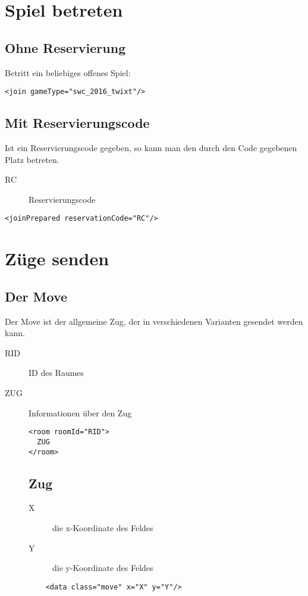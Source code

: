 \documentclass[12pt,a4paper, ngerman, oneside]{scrartcl}
\begin{document}
\section{Spiel betreten}
\subsection{Ohne Reservierung}
Betritt ein beliebiges offenes Spiel:
\begin{verbatim}
<join gameType="swc_2016_twixt"/>
\end{verbatim}
\subsection{Mit Reservierungscode}
Ist ein Reservierungscode gegeben, so kann man den durch den Code gegebenen Platz betreten.
\begin{description}
\item[RC] Reservierungscode
\end{description}
\begin{verbatim}
<joinPrepared reservationCode="RC"/>
\end{verbatim}

\section{Z\"uge senden}

\subsection{\label{Move}Der Move}
Der Move ist der allgemeine Zug, der in verschiedenen Varianten gesendet werden kann.
\begin{description}
\item[RID] ID des Raumes
\item[ZUG] Informationen \"uber den Zug
\begin{verbatim}
<room roomId="RID">
  ZUG
</room>

\end{verbatim}
\subsection{Zug}
\label{move}
\begin{description}
\item[X] die x-Koordinate des Feldes
\item[Y] die y-Koordinate des Feldes
\end{description}
\begin{verbatim}
	<data class="move" x="X" y="Y"/>
\end{verbatim}
\end{description}
\end{document}
